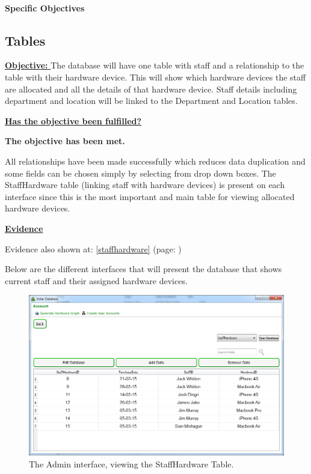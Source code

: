 \paragraph{Specific Objectives}

\subsection{Tables}

\underline{\textbf{Objective:} } The database will have one table with staff and a relationship to the table with their hardware device. This will show which hardware devices the staff are allocated and all the details of that hardware device. Staff details including department and location will be linked to the Department and Location tables.

\underline{\textbf{Has the objective been fulfilled?}}

\textbf{The objective has been met.}

All relationships have been made successfully which reduces data duplication and some fields can be chosen simply by selecting from drop down boxes. The StaffHardware table (linking staff with hardware devices) is present on each interface since this is the most important and main table for viewing allocated hardware devices.

\underline{\textbf{Evidence}}

Evidence also shown at: \ref{staffhardware} (page: \pageref{staffhardware}) 

Below are the different interfaces that will present the database that shows current staff and their assigned hardware devices.

\begin{figure}[H]
    \includegraphics[width=\textwidth]{./Evaluation/Images/Database1.png}
    \caption{The Admin interface, viewing the StaffHardware Table.} \label{fig:db1}
\end{figure}

